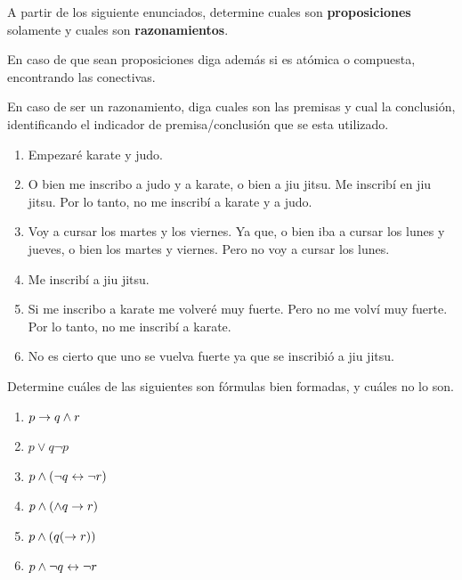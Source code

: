 \begin{exercise}
    A partir de los siguiente enunciados, determine cuales son
    \textbf{proposiciones} solamente y cuales son \textbf{razonamientos}.

    En caso de que sean proposiciones diga además si es atómica o compuesta,
    encontrando las conectivas.

    En caso de ser un razonamiento, diga cuales son las premisas y cual la
    conclusión, identificando el indicador de premisa/conclusión que se esta
    utilizado.

    \begin{enumerate}[a]
        \item Empezaré karate y judo.
        \item O bien me inscribo a judo y a karate, o bien a jiu jitsu. Me
        inscribí en jiu jitsu. Por lo tanto, no me inscribí a karate y a judo.
        \item Voy a cursar los martes y los viernes. Ya que, o bien iba a cursar
        los lunes y jueves, o bien los martes y viernes. Pero no voy a cursar
        los lunes.
        \item Me inscribí a jiu jitsu.
        \item Si me inscribo a karate me volveré muy fuerte. Pero no me volví
        muy fuerte. Por lo tanto, no me inscribí a karate.
        \item No es cierto que uno se vuelva fuerte ya que se inscribió a jiu
        jitsu.
    \end{enumerate}
\end{exercise}

\begin{exercise}
    Determine cuáles de las siguientes son fórmulas bien formadas, y cuáles no
    lo son.

    \begin{enumerate}[a]
        \item $p \to q \land r$
        \item $p \lor q \lnot p$
        \item $p \land (\lnot q \leftrightarrow \lnot r)$
        \item $p \land (\land q \to r)$
        \item $p \land (q (\to r))$
        \item $p \land \lnot q \leftrightarrow \lnot r$
    \end{enumerate}
\end{exercise}


